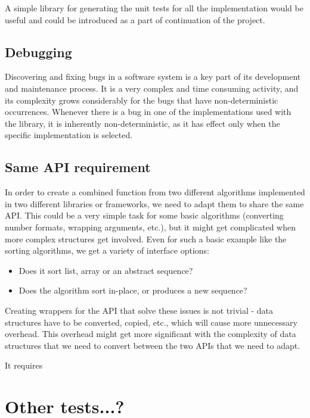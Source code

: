 A simple library for generating the unit tests for all the implementation would be useful and could be introduced as a part of continuation of the project.

\subsection{Debugging}

Discovering and fixing bugs in a software system is a key part of its development and maintenance process. It is a very complex and time consuming activity, and its complexity grows considerably for the bugs that have non-deterministic occurrences. Whenever there is a bug in one of the implementations used with the library, it is inherently non-deterministic, as it has effect only when the specific implementation is selected.

\subsection{Same API requirement}

In order to create a combined function from two different algorithms implemented in two different libraries or frameworks, we need to adapt them to share the same API. This could be a very simple task for some basic algorithms (converting number formats, wrapping arguments, etc.), but it might get complicated when more complex structures get involved. Even for such a basic example like the sorting algorithms, we get a variety of interface options:

\begin{itemize}
	\item Does it sort list, array or an abstract sequence?
	\item Does the algorithm sort in-place, or produces a new sequence?
\end{itemize}

Creating wrappers for the API that solve these issues is not trivial - data structures have to be converted, copied, etc., which will cause more unnecessary overhead. This overhead might get more significant with the complexity of data structures that we need to convert between the two APIs that we need to adapt.

It requires 

\section{Other tests...?}

